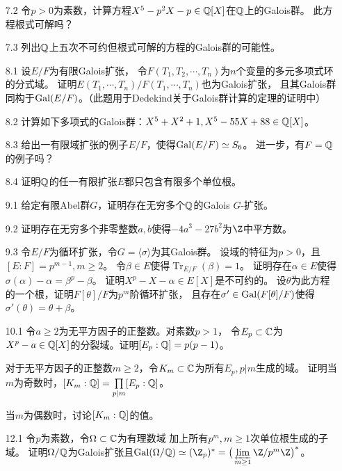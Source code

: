 \begin{itemize}
    \item[7.2] 令$p>0$为素数，计算方程$X^5-p^2X-p\in\mathbb{Q}[X]$在$\mathbb{Q}$上的Galois群。
    此方程根式可解吗？

    \item[7.3] 列出$\mathbb{Q}$上五次不可约但根式可解的方程的Galois群的可能性。

    \item[8.1] 设$E/F$为有限Galois扩张，
    令$F(T_1,T_2,\cdots,T_n)$为$n$个变量的多元多项式环的分式域。
    证明$E(T_1,\cdots,T_n)/F(T_1,\cdots,T_n)$也为Galois扩张，
    且其Galois群同构于$\operatorname{Gal}(E/F)$。（此题用于Dedekind关于Galois群计算的定理的证明中）

    \item[8.2] 计算如下多项式的Galois群：$X^5+X^2+1,X^5-55X+88\in\mathbb{Q}[X]$。

    \item[8.3] 给出一有限域扩张的例子$E/F$，使得$\operatorname{Gal}(E/F)\simeq S_6$。
    进一步，有$F=\mathbb{Q}$的例子吗？

    \item[8.4] 证明$\mathbb{Q}$的任一有限扩张$E$都只包含有限多个单位根。

    \item[9.1] 给定有限Abel群$G$，证明存在无穷多个$\mathbb{Q}$的Galois $G$-扩张。

    \item[9.2] 证明存在无穷多个非零整数$a,b$使得$-4a^3-27b^2$为$\Z$中平方数。

    \item[9.3] 令$E/F$为循环扩张，令$G=\langle\sigma\rangle$为其Galois群。
    设域的特征为$p>0$，且$[E:F]=p^{m-1},m\ge2$。
    令$\beta\in E$使得$\operatorname{Tr}_{E/F}(\beta)=1$。
    证明存在$\alpha\in E$使得$\sigma(\alpha)-\alpha=\beta^p-\beta$。
    证明$X^p-X-\alpha\in E[X]$是不可约的。
    设$\theta$为此方程的一个根，证明$F[\theta]/F$为$p^m$阶循环扩张，
    且存在$\sigma'\in\operatorname{Gal}(F[\theta]/F)$使得$\sigma'(\theta)=\theta+\beta$。

    \item[10.1] 令$a\ge2$为无平方因子的正整数。对素数$p>1$，
    令$E_p\subset\mathbb{C}$为$X^p-a\in\mathbb{Q}[X]$的分裂域。证明$[E_p:\mathbb{Q}]=p(p-1)$。

    对于无平方因子的正整数$m\ge2$，令$K_m\subset\mathbb{C}$为所有$E_p,p|m$生成的域。
    证明当$m$为奇数时，$[K_m:\mathbb{Q}]=\prod\limits_{p|m}[E_p:\mathbb{Q}]$。

    当$m$为偶数时，讨论$[K_m:\mathbb{Q}]$的值。
    
    \item[12.1] 令$p$为素数，令$\Omega\subset\mathbb{C}$为有理数域
    加上所有$p^m,m\ge1$次单位根生成的子域。
    证明$\Omega/\mathbb{Q}$为Galois扩张且$\Gal(\Omega/\Q)\simeq(\Z_p)^*
    =\big(\lim\limits_{\overleftarrow{m\ge1}}\Z/p^m\Z\big)^*$。


\end{itemize}
